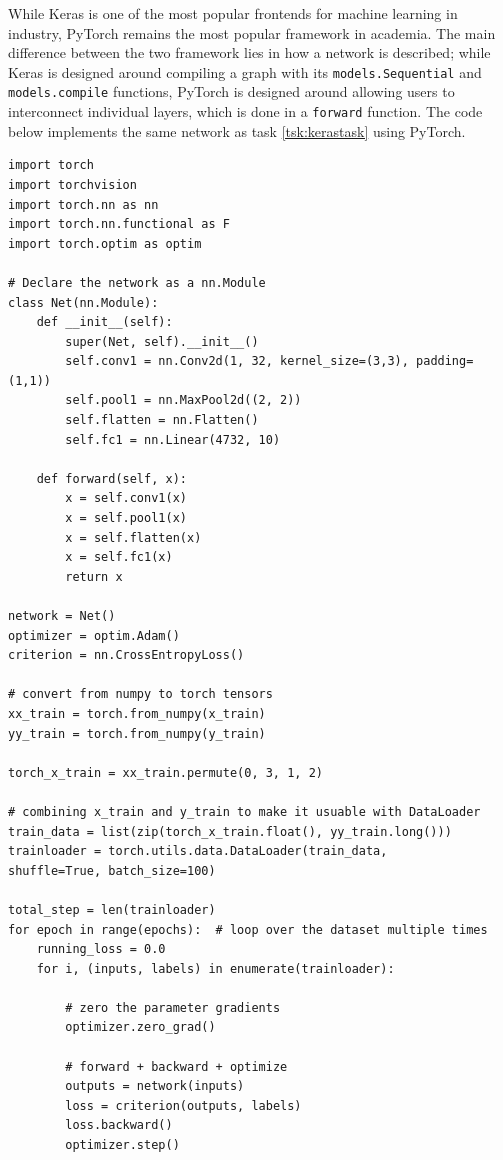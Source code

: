 \documentclass[parskip=half,notes,cadrem,toolver]{iisvlsi}
\begin{document}
While Keras is one of the most popular frontends for machine learning in industry, PyTorch remains the most popular framework in academia. The main difference between the two framework lies in how a network is described; while Keras is designed around compiling a graph with its \texttt{models.Sequential} and \texttt{models.compile} functions, PyTorch is designed around allowing users to interconnect individual layers, which is done in a \texttt{forward} function. The code below implements the same network as task \ref{tsk:kerastask} using PyTorch.
\pagebreak
\begin{lstlisting}
import torch
import torchvision
import torch.nn as nn
import torch.nn.functional as F
import torch.optim as optim

# Declare the network as a nn.Module
class Net(nn.Module):
    def __init__(self):
        super(Net, self).__init__()
        self.conv1 = nn.Conv2d(1, 32, kernel_size=(3,3), padding=(1,1))
        self.pool1 = nn.MaxPool2d((2, 2))
        self.flatten = nn.Flatten()
        self.fc1 = nn.Linear(4732, 10)

    def forward(self, x):
        x = self.conv1(x)
        x = self.pool1(x)
        x = self.flatten(x)
        x = self.fc1(x)
        return x

network = Net()
optimizer = optim.Adam()
criterion = nn.CrossEntropyLoss()

# convert from numpy to torch tensors
xx_train = torch.from_numpy(x_train)
yy_train = torch.from_numpy(y_train)

torch_x_train = xx_train.permute(0, 3, 1, 2)

# combining x_train and y_train to make it usuable with DataLoader
train_data = list(zip(torch_x_train.float(), yy_train.long()))
trainloader = torch.utils.data.DataLoader(train_data, 
shuffle=True, batch_size=100)

total_step = len(trainloader)
for epoch in range(epochs):  # loop over the dataset multiple times
    running_loss = 0.0
    for i, (inputs, labels) in enumerate(trainloader):
 
        # zero the parameter gradients
        optimizer.zero_grad()

        # forward + backward + optimize
        outputs = network(inputs)
        loss = criterion(outputs, labels)
        loss.backward()
        optimizer.step()
\end{lstlisting}

\end{document}
